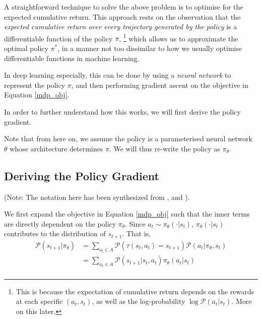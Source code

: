 \documentclass{article} %
\begin{document}
A straightforward technique to solve the above problem is to optimise for the expected cumulative return.
This approach rests on the observation that the \textit{expected cumulative return {\color{red} over every trajectory generated by the policy}} is a differentiable function of the policy $\pi$,
\footnote{\color{red} This is because the expectation of cumulative return depends on the rewards at each specific $(a_t, s_t)$, as well as the log-probability $\log \mathcal{P}(a_t | s_t)$. More on this later.}
which allows us to approximate the optimal policy $\pi^*$, in a manner not too dissimilar to how we usually
optimise differentiable functions in machine learning.

In deep learning especially, this can be done by using a \textit{neural network} to represent the policy $\pi$,
and then performing gradient ascent on the objective in Equation \eqref{mdp_obj}.

In order to further understand how this works, we will first derive the policy gradient.

Note that from here on, we assume the policy is a parameterised neural network $\theta$ whose architecture determines $\pi$.
We will thus re-write the policy as $\pi_\theta$. 


\subsection{Deriving the Policy Gradient}
(Note: The notation here has been synthesized from \cite{SpinningUp-2018}, \cite{Levine-et-al-2023} and \cite{Weng-2018}).

We first expand the objective in Equation \eqref{mdp_obj}
such that the inner terms are directly dependent on the policy $\pi_\theta$.
Since $a_t \sim \pi_\theta(\cdot | s_t)$, $\pi_\theta(\cdot | s_t)$ contributes to the distribution of $s_{t + 1}$.
That is,
\begin{equation} \label{prob_state}
    \begin{aligned}
        \mathcal{P}(s_{t + 1} | \pi_\theta) & = \sum_{a_t \in A} \mathcal{P}(\tau(s_t, a_t) = s_{t + 1}) \mathcal{P}(a_t | \pi_\theta, s_t) \\
                                            & = \sum_{a_t \in A} \mathcal{P}(s_{t + 1} | s_t, a_t) \pi_\theta(a_t | s_t) \\
    \end{aligned}
\end{equation}
\end{document}
